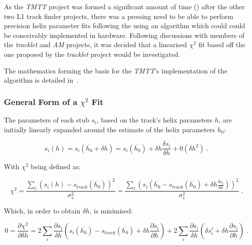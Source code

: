 As the \emph{TMTT} project was formed a significant amount of time () after the other two L1 track finder projects, there was a pressing need to be able to perform precision helix parameter fits following the \HT using an algorithm which could could be conceivably implemented in hardware.
Following discussions with members of the \emph{tracklet} and \emph{AM} projects, it was decided that a linearised $\chi^{2}$ fit based off the one proposed by the \emph{tracklet} project would be investigated.

The mathematics forming the basis for the \emph{TMTT}'s implementation of the algorithm is detailed in~\cite{CMS_DN-14-043}. 

\subsubsection{General Form of a $\chi^{2}$ Fit}\label{subsubsec:chi2maths}
The parameters of each stub $s_{i}$, based on the track’s helix parameters $h$, are initially linearly expanded around the estimate of the helix parameters $h_{0}$:

\begin{equation}
s_{i}(h) = s_{i}(\overline{h_{0}} + \delta h) = s_{i}(\overline{h_{0}}) + \delta h \frac{\delta s_{i}}{\delta h} + \mathcal{0}(\delta h^{2}) \;.
\label{eq:chi1}
\end{equation}

With $\chi^{2}$ being defined as:

\begin{equation}
\chi^{2} = \frac{\sum_{i}(s_{i}(h) - s_{track}(\overline{h_{0}}))^{2}}{\sigma^{2}_{s}} = \frac{\sum_{i}(s_{i}(\overline{h_{0}} - s_{track}(\overline{h_{0}}) + \delta h \frac{\delta s_{i}}{\delta h}))^{2}}{\sigma^{2}_{s}} \;.
\label{eq:chi2}
\end{equation}

Which, in order to obtain $\delta h$, is minimised:

\begin{equation}
0 = \frac{\partial \chi^{2}}{\partial \delta h} = 2 \sum_{i}\frac{\partial s_{i}}{\delta h}(s_{i}(\overline{h_{0}}) - s_{track}(\overline{h_{0}}) + \delta h \frac{\partial s_{i}}{\partial h}) + 2 \sum_{i}\frac{\partial s_{i}}{\delta h}(\delta s_{i}^{t} + \delta h \frac{\partial s_{i}}{\partial h}) \;.
\label{eq:chi3}
\end{equation}

